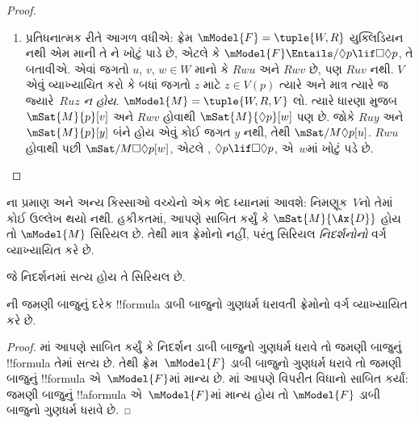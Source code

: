 \documentclass[../../../include/open-logic-section]{subfiles}
\begin{document}
\begin{proof}
\begin{enumerate}
    $\mModel{M} =\tuple{W, R, V}$ લો. $V$ની વ્યાખ્યા
    મુજબ $Ruz$ ધરાવતા બધા $z$ માટે
    $\mSat{M}{p}[z]$, તેથી $\mSat{M}{\Box p}[u]$.
    પરંતુ ધારણા મુજબ , એટલે કે $\Box p
    \lif \Box \Box p$, એ $u$માં સત્ય છે, તેથી
    $\mSat{M}{\Box \Box
      p}[u]$. $Ruv$ અને $Rvw$ હોવાથી
    $\mSat{M}{p}[w]$; $V$ની વ્યાખ્યા પ્રમાણે આ
    માત્ર $Ruw$ હોય તો જ શક્ય છે, જેમ જોઈએ તેમ.
  \item પ્રતિધનાત્મક રીતે આગળ વધીએ: ફ્રેમ
    $\mModel{F} = \tuple{W, R}$ યુક્લિડિયન નથી એમ
    માની તે ને ખોટું પાડે છે, એટલે કે
    $\mModel{F} \Entails/ \Diamond p \lif
      \Box\Diamond p$, તે બતાવીએ. એવાં જગતો
    $u$, $v$, $w \in W$ માનો કે $Rwu$ અને $Rwv$
    છે, પણ $Ruv$ નથી. $V$ એવું વ્યાખ્યાયિત કરો
    કે બધાં જગતો $z$ માટે $z \in V(p)$ ત્યારે અને
    માત્ર ત્યારે જ જ્યારે~$Ruz$ \emph{ન હોય}.
    $\mModel{M} =\tuple{W, R, V}$ લો. ત્યારે ધારણા
    મુજબ $\mSat{M}{p}[v]$ અને $Rwv$ હોવાથી
    $\mSat{M}{\Diamond p}[w]$ પણ છે. જોકે
    $Ruy$ અને $\mSat{M}{p}[y]$ બંને હોય એવું કોઈ
    જગત $y$ નથી, તેથી
    $\mSat/{M}{\Diamond
      p}[u]$. $Rwu$ હોવાથી પછી
    $\mSat/{M}{\Box\Diamond
      p}[w]$, એટલે , $\Diamond p \lif \Box\Diamond p$,
    એ~$w$માં ખોટું પડે છે.
  \end{enumerate}
\end{proof}

ના પ્રમાણ અને અન્ય કિસ્સાઓ વચ્ચેનો એક
ભેદ ધ્યાનમાં આવશે: નિમણૂક~$V$નો તેમાં કોઈ
ઉલ્લેખ થયો નથી. હકીકતમાં, આપણે સાબિત કર્યું
કે $\mSat{M}{\Ax{D}}$ હોય તો $\mModel{M}$ સિરિયલ
છે. તેથી  માત્ર ફ્રેમોનો નહીં, પરંતુ સિરિયલ
\emph{નિદર્શનોનો} વર્ગ વ્યાખ્યાયિત કરે છે.

\begin{cor}
  જે નિદર્શનમાં  સત્ય હોય તે સિરિયલ છે.
\end{cor}

\begin{cor}
ની જમણી બાજુનું દરેક
!!{formula} ડાબી બાજુનો ગુણધર્મ ધરાવતી
ફ્રેમોનો વર્ગ વ્યાખ્યાયિત કરે છે.
\end{cor}

\begin{proof}
  માં આપણે સાબિત કર્યું
  કે નિદર્શન ડાબી બાજુનો ગુણધર્મ ધરાવે તો જમણી
  બાજુનું !!{formula} તેમાં સત્ય છે. તેથી ફ્રેમ~$\mModel{F}$
ડાબી બાજુનો ગુણધર્મ ધરાવે તો જમણી બાજુનું
  !!{formula} એ~$\mModel{F}$માં માન્ય છે.
  માં આપણે વિપરીત
  વિધાનો સાબિત કર્યાં: જમણી બાજુનું !!a{formula}
  એ~$\mModel{F}$માં માન્ય હોય તો $\mModel{F}$ ડાબી
  બાજુનો ગુણધર્મ ધરાવે છે.
\end{proof}
\end{document}
